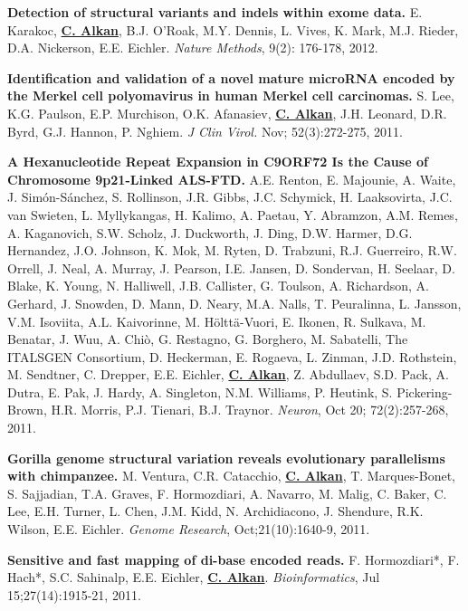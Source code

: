 \documentclass[margin,line]{res}
\begin{document}
\begin{resume}
\vspace{-.2cm}
{\bf Detection of structural variants and indels within exome data.} E. Karakoc, {\bf {\underline {C. Alkan}}}, B.J. O'Roak, 
M.Y. Dennis, L. Vives, K. Mark, M.J. Rieder, D.A. Nickerson, E.E. Eichler. {\em Nature Methods}, 9(2): 176-178, 2012.


\vspace{-.2cm}
{\bf Identification and validation of a novel mature microRNA encoded by the Merkel cell polyomavirus in human Merkel cell carcinomas.}
S. Lee, K.G. Paulson, E.P. Murchison, O.K. Afanasiev, {\bf {\underline {C. Alkan}}}, J.H. Leonard, D.R. Byrd, G.J. Hannon, 
P. Nghiem. {\em J Clin Virol.} Nov; 52(3):272-275, 2011.


\vspace{-.2cm}
{\bf A Hexanucleotide Repeat Expansion in C9ORF72 Is the Cause of Chromosome 9p21-Linked ALS-FTD.}  
A.E. Renton, E. Majounie, A. Waite, J. Simón-Sánchez, S. Rollinson, J.R. Gibbs, J.C. Schymick, H. Laaksovirta, J.C. van Swieten, L. Myllykangas, 
H. Kalimo, A. Paetau, Y. Abramzon, A.M. Remes, A. Kaganovich, S.W. Scholz, J. Duckworth, J. Ding, D.W. Harmer, D.G. Hernandez, J.O. Johnson, 
K. Mok, M. Ryten, D. Trabzuni, R.J. Guerreiro, R.W. Orrell, J. Neal, A. Murray, J. Pearson, I.E. Jansen, D. Sondervan, H. Seelaar, D. Blake, 
K. Young, N. Halliwell, J.B. Callister, G. Toulson, A. Richardson, A. Gerhard, J. Snowden, D. Mann, D. Neary, M.A. Nalls, T. Peuralinna, 
L. Jansson, V.M. Isoviita, A.L. Kaivorinne, M. Hölttä-Vuori, E. Ikonen, R. Sulkava, M. Benatar, J. Wuu, A. Chiò, G. Restagno, 
G. Borghero, M. Sabatelli, The ITALSGEN Consortium, D. Heckerman, E. Rogaeva, L. Zinman, J.D. Rothstein, M. Sendtner, C. Drepper, E.E. Eichler, 
{\bf {\underline {C. Alkan}}}, Z. Abdullaev, S.D. Pack, A. Dutra, E. Pak, J. Hardy, A. Singleton, N.M. Williams, P. Heutink, S. Pickering-Brown, 
H.R. Morris, P.J. Tienari, B.J. Traynor. {\em Neuron}, Oct 20; 72(2):257-268, 2011.

\vspace{-.2cm}
{\bf Gorilla genome structural variation reveals evolutionary parallelisms with chimpanzee.}
M. Ventura, C.R. Catacchio, {\bf {\underline {C. Alkan}}}, T. Marques-Bonet, S. Sajjadian, T.A. Graves, F. Hormozdiari, A. Navarro, 
M. Malig, C. Baker, C. Lee, E.H. Turner, L. Chen, J.M. Kidd, N. Archidiacono, J. Shendure, R.K. Wilson, E.E. Eichler.
{\em Genome Research}, Oct;21(10):1640-9, 2011.


\vspace{-.2cm}
{\bf Sensitive and fast mapping of di-base encoded reads.}
F. Hormozdiari*, F. Hach*, S.C. Sahinalp, E.E. Eichler, {\bf {\underline {C. Alkan}}}.
{\em Bioinformatics}, Jul 15;27(14):1915-21, 2011.


\end{resume}
\end{document}
